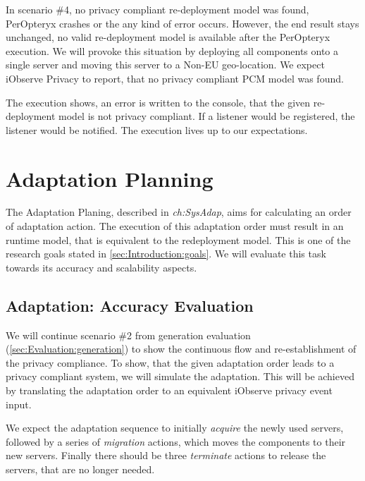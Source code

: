 In scenario \#4, no privacy compliant re-deployment model was found, PerOpteryx crashes or the any kind of error occurs. However, the end result stays unchanged, no valid re-deployment model is available after the PerOpteryx execution. We will provoke this situation by deploying all components onto a single server and moving this server to a Non-EU geo-location. We expect iObserve Privacy to report, that no privacy compliant PCM model was found.

The execution shows, an error is written to the console, that the given re-deployment model is not privacy compliant. If a listener would be registered, the listener would be notified. The execution lives up to our expectations. 

\section{Adaptation Planning}
\label{sec:Evaluation:planning}

The Adaptation Planing, described in \textit{ch:SysAdap}, aims for calculating an order of adaptation action. The execution of this adaptation order must result in an runtime model, that is equivalent to the redeployment model. This is one of the research goals stated in \autoref{sec:Introduction:goals}. We will evaluate this task towards its accuracy and scalability aspects.

 
\subsection{Adaptation: Accuracy Evaluation}

We will continue scenario \#2 from generation evaluation (\autoref{sec:Evaluation:generation}) to show the continuous flow and re-establishment of the privacy compliance. To show, that the given adaptation order leads to a privacy compliant system, we will simulate the adaptation. This will be achieved by translating the adaptation order to an equivalent iObserve privacy event input.


We expect the adaptation sequence to initially \textit{acquire} the newly used servers, followed by a series of \textit{migration} actions, which moves the components to their new servers. Finally there should be three \textit{terminate} actions to release the servers, that are no longer needed.

